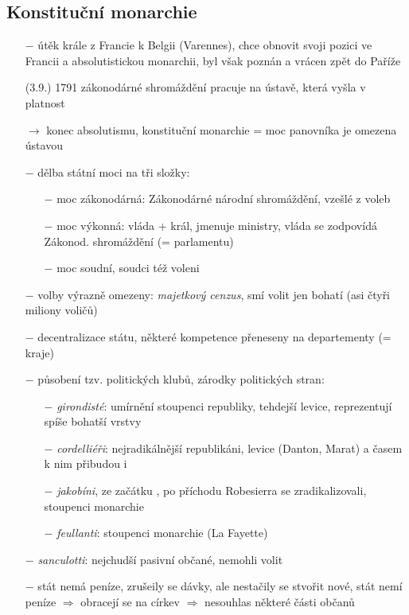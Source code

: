 \documentclass{article}
\begin{document}
\subsection*{Konstituční monarchie}
\begin{itemize}
    \vspace{-0.5em}
    \setlength\itemsep{0.15em}
    \item[$-$] útěk krále z Francie k Belgii (Varennes), chce obnovit svoji pozici ve Francii a absolutistickou monarchii, byl však poznán a vrácen zpět do Paříže
    \item[(3.9.) 1791] zákonodárné shromáždění pracuje na ústavě, která vyšla v platnost
    \item[$\rightarrow$] konec absolutismu, konstituční monarchie = moc panovníka je omezena ústavou
    \item[$-$] dělba státní moci na tři složky:
    \begin{itemize}
        \vspace{-0.5em}
        \setlength\itemsep{0.15em}
        \item[$-$] moc zákonodárná: Zákonodárné národní shromáždění, vzešlé z voleb
        \item[$-$] moc výkonná: vláda + král, jmenuje ministry, vláda se zodpovídá Zákonod. shromáždění (= parlamentu)
        \item[$-$] moc soudní, soudci též voleni
    \end{itemize}
    \item[$-$] volby výrazně omezeny: \textit{majetkový cenzus}, smí volit jen bohatí (asi čtyři miliony voličů)
    \item[$-$] decentralizace státu, některé kompetence přeneseny na departementy (= kraje)
    \item[$-$] působení tzv. politických klubů, zárodky politických stran:
    \begin{itemize}
        \vspace{-0.5em}
        \setlength\itemsep{0.15em}
        \item[$-$] \textit{girondisté}: umírnění stoupenci republiky, tehdejší levice, reprezentují spíše bohatší vrstvy
        \item[$-$] \textit{cordelliéři}: nejradikálnější republikáni, levice (Danton, Marat) a časem k nim přibudou i \item[$-$] \textit{jakobíni}, ze začátku , po příchodu Robesierra se zradikalizovali, stoupenci monarchie
        \item[$-$] \textit{feullanti}: stoupenci monarchie (La Fayette)
    \end{itemize}
    \item[$-$] \textit{sanculotti}: nejchudší pasivní občané, nemohli volit
    \item[$-$] stát nemá peníze, zrušeily se dávky, ale nestačily se stvořit nové, stát nemí peníze $\Rightarrow$ obracejí se na církev $\Rightarrow$ nesouhlas některé části občanů
\end{itemize}
\end{document}
